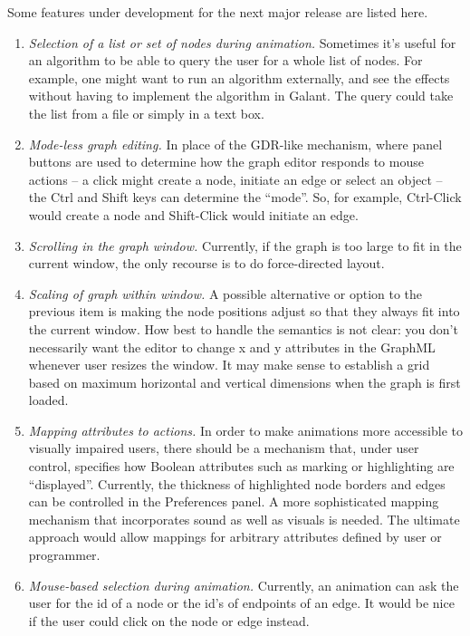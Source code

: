Some features under development for the next major release are listed here.

\begin{enumerate}
\item
  \emph{Selection of a list or set of nodes during animation.}
  Sometimes it's useful for an algorithm to be able to query the user for a
  whole list of nodes.
  For example, one might want to run an algorithm
  externally, and see the effects without having to implement the algorithm
  in Galant. The query could take the list from a file or simply in a text box.
\item
  \emph{Mode-less graph editing.}
  In place of the GDR-like mechanism, where panel buttons are used to determine
  how the graph editor responds to mouse actions -- a click might create a node,
  initiate an edge or select an object --
  the \textsf{Ctrl} and \textsf{Shift} keys can determine the ``mode''.
  So, for example, \textsf{Ctrl-Click} would create a node and
  \textsf{Shift-Click} would initiate an edge.

\item \emph{Scrolling in the graph window.} Currently, if the graph is too
  large to fit in the current window, the only recourse is to do
  force-directed layout.

\item \emph{Scaling of graph within window.} A possible alternative or option
  to the previous item is making the node positions adjust so that they
  always fit into the current window. How best to handle the semantics is not
  clear: you don't necessarily want the editor to change x and y attributes
  in the GraphML whenever user resizes the window. It may make sense to
  establish a grid based on maximum horizontal and vertical dimensions when
  the graph is first loaded.

\item
  \emph{Mapping attributes to actions.}
  In order to make animations more accessible to visually impaired users,
  there should be a mechanism that, under user control, specifies how Boolean
  attributes such as marking or highlighting are ``displayed''.
  Currently, the thickness of highlighted node borders and edges can be
  controlled in the \textsf{Preferences} panel.
  A more sophisticated mapping mechanism that incorporates sound as well as visuals is needed.
  The ultimate approach would allow mappings for arbitrary attributes
  defined by user or programmer.

\item
  \emph{Mouse-based selection during animation.}
  Currently, an animation can ask the user for the id of a node or the id's
  of endpoints of an edge. It would be nice if the user could click on the
  node or edge instead.


\end{enumerate}
